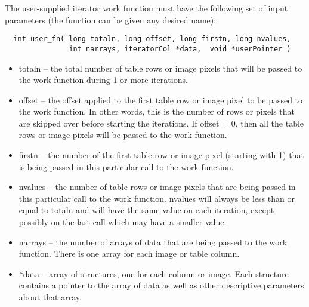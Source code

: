 \documentclass[11pt]{book}
\begin{document}
The user-supplied iterator work function must have the following set of
input parameters (the function can be given any desired name):


\begin{verbatim}
  int user_fn( long totaln, long offset, long firstn, long nvalues,
               int narrays, iteratorCol *data,  void *userPointer )
\end{verbatim}

\begin{itemize}

\item
  totaln -- the total number of table rows or image pixels
            that will be passed to the work function
            during 1 or more iterations.

\item
  offset     -- the offset applied to the first table row or image
                pixel to be passed to the work function.  In other
                words, this is the number of rows or pixels that
                are skipped over before starting the iterations. If
                offset = 0, then all the table rows or image pixels
                will be passed to the work function.

\item
  firstn     -- the number of the first table row or image pixel
                (starting with 1)  that is being passed in this
                particular call to the work function.

\item
  nvalues    -- the number of table rows or image pixels that are
                being passed in this particular call to the work
                function.  nvalues will always be less than or
                equal to totaln and will have the same value on
                each iteration, except possibly on the last
                call which may have a smaller value.

\item
  narrays     -- the number of arrays of data that are being passed
                 to the work function.  There is one array for each
                 image or table column.

\item
  *data   -- array of structures, one for each
             column or image.  Each structure contains a pointer
             to the array of data as well as other descriptive
             parameters about that array.


\end{itemize}
\end{document}
